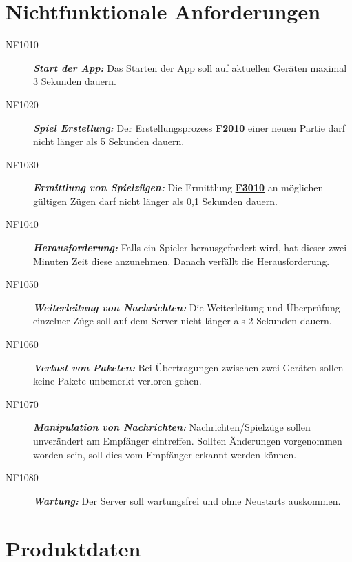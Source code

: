 \documentclass[parskip=full]{scrartcl}
\begin{document}
\section{Nichtfunktionale Anforderungen}
\begin{description}
	
	\item[NF1010] \textbf{\textit{Start der App: }} Das Starten der App soll auf aktuellen Geräten maximal 3 Sekunden dauern. 
	\item[NF1020] \textbf{\textit{Spiel Erstellung: }} Der Erstellungsprozess \hyperlink{F2010}{\textbf{F2010}} einer neuen Partie darf nicht länger als 5 Sekunden dauern.
	\item[NF1030] \textbf{\textit{Ermittlung von Spielzügen: }} Die Ermittlung \hyperlink{F3010}{\textbf{F3010}} an möglichen gültigen Zügen darf nicht länger als 0,1 Sekunden dauern.
	\item[NF1040] \textbf{\textit{Herausforderung: }} Falls ein Spieler herausgefordert wird, hat dieser zwei Minuten Zeit diese anzunehmen. Danach verfällt die Herausforderung. 
	\item[NF1050] \textbf{\textit{Weiterleitung von Nachrichten: }} Die Weiterleitung und Überprüfung einzelner Züge soll auf dem Server nicht länger als 2 Sekunden dauern.
	\item[NF1060] \textbf{\textit{Verlust von Paketen: }} Bei Übertragungen zwischen zwei Geräten sollen keine Pakete unbemerkt verloren gehen.
	\item[NF1070] \textbf{\textit{Manipulation von Nachrichten: }} Nachrichten/Spielzüge sollen unverändert am Empfänger eintreffen. Sollten Änderungen vorgenommen worden sein, soll dies vom Empfänger erkannt werden können.
	\item[NF1080] \textbf{\textit{Wartung: }} Der Server soll wartungsfrei und ohne Neustarts auskommen.

	
\end{description}

\newpage
\section{Produktdaten}
\end{document}
